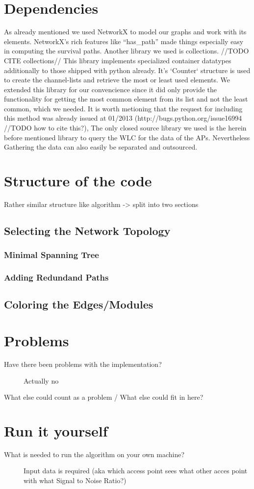 \section{Dependencies}
  As already mentioned we used NetworkX\cite{hagberg-2008-exploring} to model our graphs and work with its elements.
  NetworkX's rich features like ``has\_path'' made things especially easy in computing the survival paths.
  Another library we used is collections. //TODO CITE collections// 
  This library implements specialized container datatypes additionally to those shipped with python already.
  It's `Counter` structure is used to create the channel-lists and retrieve the most or least used elements.
  We extended this library for our convencience since it did only provide the functionality for getting the most common element from its list and not the least common,
  which we needed. It is worth metioning that the request for including this method was already issued at 01/2013 (http://bugs.python.org/issue16994 //TODO how to cite this?),
  The only closed source library we used is the herein before mentioned library to query the WLC for the data of the APs. Nevertheless Gathering the data can also
  easily be separated and outsourced.
\section{Structure of the code}
  Rather similar structure like algorithm -> split into two sections
  \subsection{Selecting the Network Topology}
    \subsubsection{Minimal Spanning Tree}
    \subsubsection{Adding Redundand Paths}
  \subsection{Coloring the Edges/Modules}
\section{Problems}
  \begin{description}
   \item[Have there been problems with the implementation?]
   Actually no
   \item[What else could count as a problem / What else could fit in here?]
  \end{description}
\section{Run it yourself}
  \begin{description}
   \item[What is needed to run the algorithm on your own machine?]
    Input data is required (aka which access point sees what other acces point with what Signal to Noise Ratio?) \newline
  \end{description}
